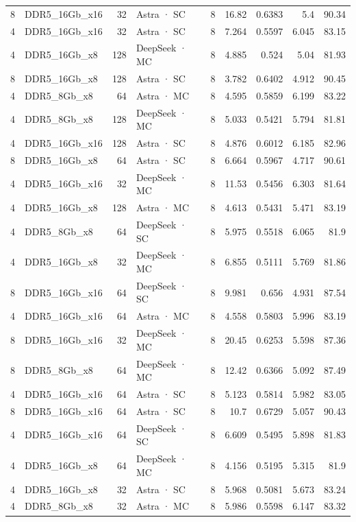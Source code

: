 \begin{tabular}{rlrlrrrrr}
8 & DDR5\_16Gb\_x16 & 32 & Astra · SC & 8 & 16.82 & 0.6383 & 5.4 & 90.34 \\
4 & DDR5\_16Gb\_x16 & 32 & Astra · SC & 8 & 7.264 & 0.5597 & 6.045 & 83.15 \\
4 & DDR5\_16Gb\_x8 & 128 & DeepSeek · MC & 8 & 4.885 & 0.524 & 5.04 & 81.93 \\
8 & DDR5\_16Gb\_x8 & 128 & Astra · SC & 8 & 3.782 & 0.6402 & 4.912 & 90.45 \\
4 & DDR5\_8Gb\_x8 & 64 & Astra · MC & 8 & 4.595 & 0.5859 & 6.199 & 83.22 \\
4 & DDR5\_8Gb\_x8 & 128 & DeepSeek · MC & 8 & 5.033 & 0.5421 & 5.794 & 81.81 \\
4 & DDR5\_16Gb\_x16 & 128 & Astra · SC & 8 & 4.876 & 0.6012 & 6.185 & 82.96 \\
8 & DDR5\_16Gb\_x8 & 64 & Astra · SC & 8 & 6.664 & 0.5967 & 4.717 & 90.61 \\
4 & DDR5\_16Gb\_x16 & 32 & DeepSeek · MC & 8 & 11.53 & 0.5456 & 6.303 & 81.64 \\
4 & DDR5\_16Gb\_x8 & 128 & Astra · MC & 8 & 4.613 & 0.5431 & 5.471 & 83.19 \\
4 & DDR5\_8Gb\_x8 & 64 & DeepSeek · SC & 8 & 5.975 & 0.5518 & 6.065 & 81.9 \\
4 & DDR5\_16Gb\_x8 & 32 & DeepSeek · MC & 8 & 6.855 & 0.5111 & 5.769 & 81.86 \\
8 & DDR5\_16Gb\_x16 & 64 & DeepSeek · SC & 8 & 9.981 & 0.656 & 4.931 & 87.54 \\
4 & DDR5\_16Gb\_x16 & 64 & Astra · MC & 8 & 4.558 & 0.5803 & 5.996 & 83.19 \\
8 & DDR5\_16Gb\_x16 & 32 & DeepSeek · MC & 8 & 20.45 & 0.6253 & 5.598 & 87.36 \\
8 & DDR5\_8Gb\_x8 & 64 & DeepSeek · MC & 8 & 12.42 & 0.6366 & 5.092 & 87.49 \\
4 & DDR5\_16Gb\_x16 & 64 & Astra · SC & 8 & 5.123 & 0.5814 & 5.982 & 83.05 \\
8 & DDR5\_16Gb\_x16 & 64 & Astra · SC & 8 & 10.7 & 0.6729 & 5.057 & 90.43 \\
4 & DDR5\_16Gb\_x16 & 64 & DeepSeek · SC & 8 & 6.609 & 0.5495 & 5.898 & 81.83 \\
4 & DDR5\_16Gb\_x8 & 64 & DeepSeek · MC & 8 & 4.156 & 0.5195 & 5.315 & 81.9 \\
4 & DDR5\_16Gb\_x8 & 32 & Astra · SC & 8 & 5.968 & 0.5081 & 5.673 & 83.24 \\
4 & DDR5\_8Gb\_x8 & 32 & Astra · MC & 8 & 5.986 & 0.5598 & 6.147 & 83.32 \\
\bottomrule
\end{tabular}
